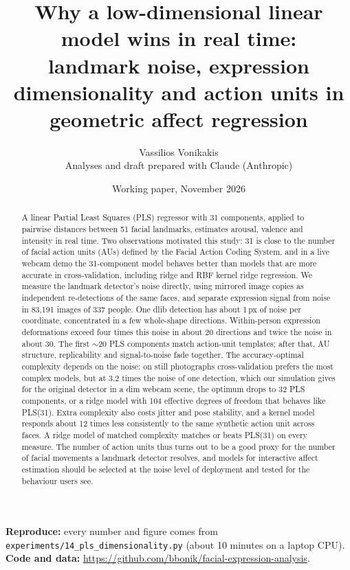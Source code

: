 \documentclass[11pt,a4paper]{article}
\title{Why a low-dimensional linear model wins in real time:\\[0.2em]
\large landmark noise, expression dimensionality and action units in geometric affect regression}
\author{Vassilios Vonikakis\\[0.3em]
\small Analyses and draft prepared with Claude (Anthropic)}
\date{Working paper, November 2026}
\begin{document}
\maketitle

\begin{abstract}
\noindent A linear Partial Least Squares (PLS) regressor with 31 components, applied to pairwise
distances between 51 facial landmarks, estimates arousal, valence and intensity in real time. Two
observations motivated this study: 31 is close to the number of facial action units (AUs)
defined by the Facial Action Coding System, and in a live webcam demo the 31-component model
behaves better than models that are more accurate in cross-validation, including ridge and RBF
kernel ridge regression. We measure the landmark detector's noise directly, using mirrored image
copies as independent re-detections of the same faces, and separate expression signal from noise
in 83,191 images of 337 people. One dlib detection has about 1\,px of noise per coordinate,
concentrated in a few whole-shape directions. Within-person expression deformations exceed four
times this noise in about 20 directions and twice the noise in about 30. The first $\sim$20 PLS
components match action-unit templates; after that, AU structure, replicability and
signal-to-noise fade together. The accuracy-optimal complexity depends on the noise: on still
photographs cross-validation prefers the most complex models, but at 3.2 times the noise of one
detection, which our simulation gives for the original detector in a dim webcam scene, the optimum
drops to 32 PLS components, or a ridge model with 104 effective degrees of freedom that behaves
like PLS(31). Extra complexity also costs jitter and pose stability, and a kernel model responds
about 12 times less consistently to the same synthetic action unit across faces. A ridge model of
matched complexity matches or beats PLS(31) on every measure. The number of action units thus
turns out to be a good proxy for the number of facial movements a landmark detector resolves, and
models for interactive affect estimation should be selected at the noise level of deployment and
tested for the behaviour users see.
\end{abstract}

\noindent\textbf{Reproduce:} every number and figure comes from
\nolinkurl{experiments/14_pls_dimensionality.py} (about 10 minutes on a laptop CPU).\\
\textbf{Code and data:} \url{https://github.com/bbonik/facial-expression-analysis}.
\end{document}
